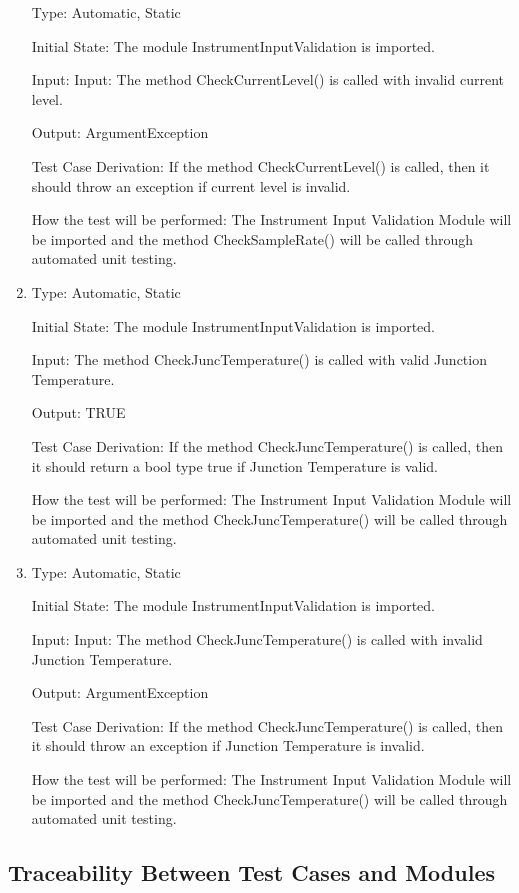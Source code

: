 \documentclass[12pt, titlepage]{article}
\begin{document}
\begin{enumerate}[{UT-II}1.]
  Type: Automatic, Static 

  Initial State: The module InstrumentInputValidation is imported.

  Input: Input: The method CheckCurrentLevel() is called with invalid current level.

  Output: ArgumentException

  Test Case Derivation: If the method CheckCurrentLevel() is called, then it should throw an exception if current level is invalid.

  How the test will be performed: The Instrument Input Validation Module will be imported and the method CheckSampleRate() will be called through automated unit testing.

  
  \item
  
  Type: Automatic, Static 

  Initial State: The module InstrumentInputValidation is imported.

  Input: The method CheckJuncTemperature() is called with valid Junction Temperature.

  Output: TRUE 

  Test Case Derivation: If the method CheckJuncTemperature() is called, then it should return a bool type true if Junction Temperature is valid.

  How the test will be performed: The Instrument Input Validation Module will be imported and the method CheckJuncTemperature() will be called through automated unit testing. 

  \item
  
  Type: Automatic, Static 

  Initial State: The module InstrumentInputValidation is imported.

  Input: Input: The method CheckJuncTemperature() is called with invalid Junction Temperature.

  Output: ArgumentException

  Test Case Derivation: If the method CheckJuncTemperature() is called, then it  should throw an exception if Junction Temperature is invalid.

  How the test will be performed: The Instrument Input Validation Module will be imported and the method CheckJuncTemperature() will be called through automated unit testing.

\end{enumerate}

\subsection{Traceability Between Test Cases and Modules}
\end{document}
